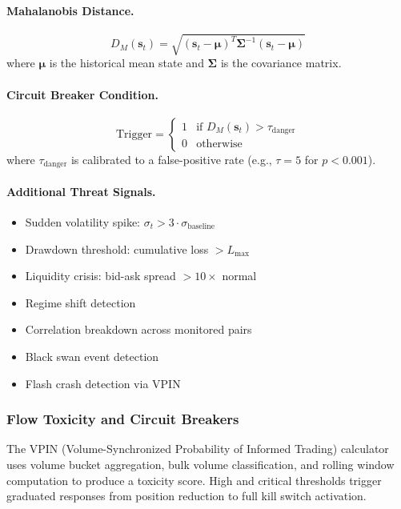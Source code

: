 \documentclass[12pt, a4paper]{article}
\begin{document}
\paragraph{Mahalanobis Distance.}
\begin{equation}
	D_M(\mathbf{s}_t) = \sqrt{{(\mathbf{s}_t - \boldsymbol{\mu})}^T \boldsymbol{\Sigma}^{-1} (\mathbf{s}_t - \boldsymbol{\mu})}
	\label{eq:mahalanobis}
\end{equation}
where $\boldsymbol{\mu}$ is the historical mean state and $\boldsymbol{\Sigma}$ is the covariance matrix.

\paragraph{Circuit Breaker Condition.}
\begin{equation}
	\text{Trigger} = \begin{cases}
		1 & \text{if } D_M(\mathbf{s}_t) > \tau_{\text{danger}} \\
		0 & \text{otherwise}
	\end{cases}
	\label{eq:circuit_breaker}
\end{equation}
where $\tau_{\text{danger}}$ is calibrated to a false-positive rate (e.g., $\tau = 5$ for $p < 0.001$).

\paragraph{Additional Threat Signals.}
\begin{itemize}
	\item Sudden volatility spike: $\sigma_t > 3 \cdot \sigma_{\text{baseline}}$
	\item Drawdown threshold: cumulative loss $> L_{\max}$
	\item Liquidity crisis: bid-ask spread $> 10 \times$ normal
	\item Regime shift detection
	\item Correlation breakdown across monitored pairs
	\item Black swan event detection
	\item Flash crash detection via VPIN
\end{itemize}

\subsubsection{Flow Toxicity and Circuit Breakers}

The VPIN (Volume-Synchronized Probability of Informed Trading) calculator \citep{easley2011vpin, easley2012flow} uses volume bucket aggregation, bulk volume classification, and rolling window computation to produce a toxicity score. High and critical thresholds trigger graduated responses from position reduction to full kill switch activation.
\end{document}
